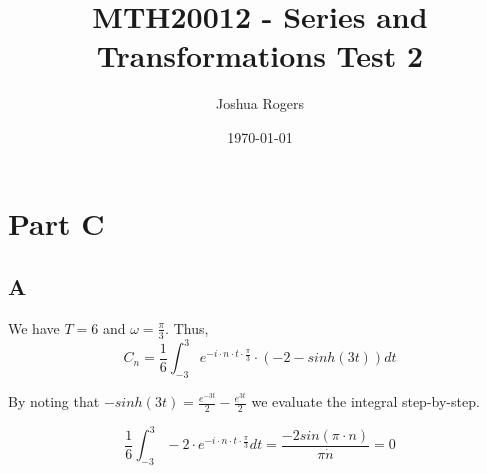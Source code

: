 \documentclass{article}
\title{\vspace{-4cm}MTH20012 - Series and Transformations Test 2}
\author{Joshua Rogers}
\date\today
\begin{document}
\maketitle 

\section*{Part C}

\subsection*{A}

We have $T=6$ and $\omega = \frac{\pi}{3}$. Thus,
$$C_n = \frac{1}{6} \int_{-3}^{3} e^{-i \cdot n \cdot t \cdot \frac{\pi}{3}} \cdot \left(-2-sinh(3t)\right) dt$$

By noting that $-sinh(3t) = \frac{e^{-3t}}{2} - \frac{e^{3t}}{2}$ we evaluate the integral step-by-step.

$$
\frac{1}{6} \int_{-3}^{3} -2 \cdot e^{-i \cdot n \cdot t \cdot \frac{\pi}{3}} dt = \frac{-2sin(\pi \cdot n)}{\pi \dot n} = 0
$$
\end{document}
